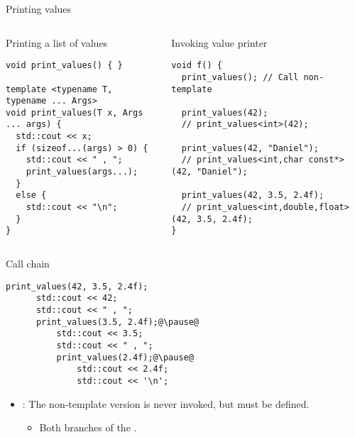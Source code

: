 \begin{frame}[t,fragile]{Printing values}

\begin{columns}[T]

\begin{block}{Printing a list of values}
\begin{lstlisting}
void print_values() { }

template <typename T, typename ... Args>
void print_values(T x, Args ... args) {
  std::cout << x;
  if (sizeof...(args) > 0) {
    std::cout << " , ";
    print_values(args...);
  }
  else {
    std::cout << "\n";
  }
}
\end{lstlisting}
\end{block}

\begin{block}{Invoking value printer}
\begin{lstlisting}
void f() {
  print_values(); // Call non-template

  print_values(42);
  // print_values<int>(42);

  print_values(42, "Daniel");
  // print_values<int,char const*>(42, "Daniel");

  print_values(42, 3.5, 2.4f);
  // print_values<int,double,float>(42, 3.5, 2.4f);
}
\end{lstlisting}
\end{block}

\end{columns}
\end{frame}

\begin{frame}[t,fragile]{Call chain}
\begin{lstlisting}[escapechar=@]
  print_values(42, 3.5, 2.4f);
      std::cout << 42;
      std::cout << " , ";
      print_values(3.5, 2.4f);@\pause@
          std::cout << 3.5;
          std::cout << " , ";
          print_values(2.4f);@\pause@
              std::cout << 2.4f;
              std::cout << '\n';
\end{lstlisting}

\begin{itemize}
  \item {}: The non-template version is never invoked,
        but must be defined.
    \begin{itemize}
      \item Both branches of the  .
    \end{itemize}
\end{itemize}
\end{frame}
